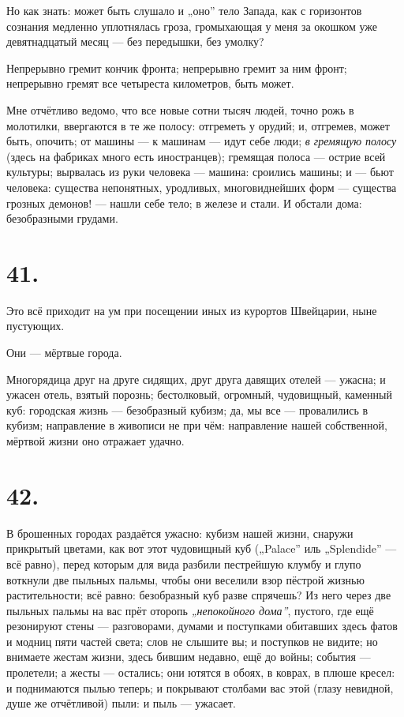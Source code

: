 \documentclass[12pt,a4paper,oneside]{book}
\begin{document}
Но как знать: может быть слушало и „оно” тело Запада, как с горизонтов сознания медленно уплотнялась гроза, громыхающая у меня за окошком уже девятнадцатый месяц — без передышки, без умолку?

Непрерывно гремит кончик фронта; непрерывно гремит за ним фронт; непрерывно гремят все четыреста километров, быть может.

Мне отчётливо ведомо, что все новые сотни тысяч людей, точно рожь в молотилки, ввергаются в те же полосу: отгреметь у орудий; и, отгремев, может быть, опочить; от машины — к машинам — идут себе люди; \emph{в гремящую полосу} (здесь на фабриках много есть иностранцев); гремящая полоса — острие всей культуры; вырвалась из руки человека — машина: сроились машины; и — бьют человека: существа непонятных, уродливых, многовиднейших форм — существа грозных демонов! — нашли себе тело; в железе и стали. И обстали дома: безобразными грудами.

\section*{41.}

Это всё приходит на ум при посещении иных из курортов Швейцарии, ныне пустующих.

Они — мёртвые города.

Многорядица друг на друге сидящих, друг друга давящих отелей — ужасна; и ужасен отель, взятый порознь; бестолковый, огромный, чудовищный, каменный куб: городская жизнь — безобразный кубизм; да, мы все — провалились в кубизм; направление в живописи не при чём: направление нашей собственной, мёртвой жизни оно отражает удачно.

\section*{42.}

В брошенных городах раздаётся ужасно: кубизм нашей жизни, снаружи прикрытый цветами, как вот этот чудовищный куб („Palace” иль „Splendide” — всё равно), перед которым для вида разбили пестрейшую клумбу и глупо воткнули две пыльных пальмы, чтобы они веселили взор пёстрой жизнью растительности; всё равно: безобразный куб разве спрячешь? Из него через две пыльных пальмы на вас прёт оторопь \emph{„непокойного дома”}, пустого, где ещё резонируют стены — разговорами, думами и поступками обитавших здесь фатов и модниц пяти частей света; слов не слышите вы; и поступков не видите; но внимаете жестам жизни, здесь бившим недавно, ещё до войны; события — пролетели; а жесты — остались; они ютятся в обоях, в коврах, в плюше кресел: и поднимаются пылью теперь; и покрывают столбами вас этой (глазу невидной, душе же отчётливой) пыли: и пыль — ужасает.
\end{document}
